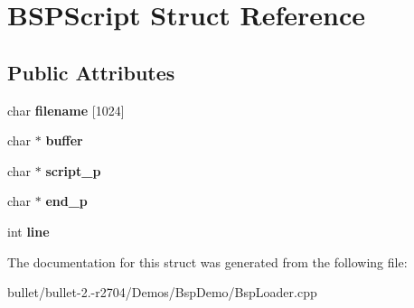 \hypertarget{struct_b_s_p_script}{\section{B\+S\+P\+Script Struct Reference}
\label{struct_b_s_p_script}
}
\subsection*{Public Attributes}
\begin{DoxyCompactItemize}
\item 
\hypertarget{struct_b_s_p_script_adf7519b4e980208e7fb16daff2cb32a2}{char {\bfseries filename} \mbox{[}1024\mbox{]}}\label{struct_b_s_p_script_adf7519b4e980208e7fb16daff2cb32a2}

\item 
\hypertarget{struct_b_s_p_script_a0a43218cd8e75d837d837cc03262a8c4}{char $\ast$ {\bfseries buffer}}\label{struct_b_s_p_script_a0a43218cd8e75d837d837cc03262a8c4}

\item 
\hypertarget{struct_b_s_p_script_aaa4e37201fdae4e1cb6bf63d714f94f9}{char $\ast$ {\bfseries script\+\_\+p}}\label{struct_b_s_p_script_aaa4e37201fdae4e1cb6bf63d714f94f9}

\item 
\hypertarget{struct_b_s_p_script_a9fc69b6a2cac9fc9ed42a5e4920f3ccb}{char $\ast$ {\bfseries end\+\_\+p}}\label{struct_b_s_p_script_a9fc69b6a2cac9fc9ed42a5e4920f3ccb}

\item 
\hypertarget{struct_b_s_p_script_a5a6e4c5eb01f880419831231face32ad}{int {\bfseries line}}\label{struct_b_s_p_script_a5a6e4c5eb01f880419831231face32ad}

\end{DoxyCompactItemize}


The documentation for this struct was generated from the following file\+:\begin{DoxyCompactItemize}
\item 
bullet/bullet-\/2.-\/r2704/\+Demos/\+Bsp\+Demo/Bsp\+Loader.\+cpp\end{DoxyCompactItemize}
